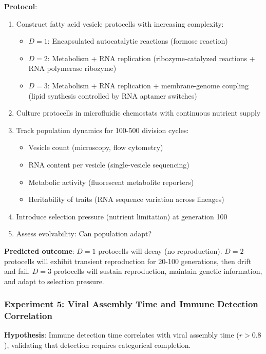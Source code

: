 \documentclass[11pt]{article}
\begin{document}
\textbf{Protocol}:
\begin{enumerate}
\item Construct fatty acid vesicle protocells with increasing complexity:
\begin{itemize}
\item $D = 1$: Encapsulated autocatalytic reactions (formose reaction)
\item $D = 2$: Metabolism + RNA replication (ribozyme-catalyzed reactions + RNA polymerase ribozyme)
\item $D = 3$: Metabolism + RNA replication + membrane-genome coupling (lipid synthesis controlled by RNA aptamer switches)
\end{itemize}
\item Culture protocells in microfluidic chemostats with continuous nutrient supply
\item Track population dynamics for 100-500 division cycles:
\begin{itemize}
\item Vesicle count (microscopy, flow cytometry)
\item RNA content per vesicle (single-vesicle sequencing)
\item Metabolic activity (fluorescent metabolite reporters)
\item Heritability of traits (RNA sequence variation across lineages)
\end{itemize}
\item Introduce selection pressure (nutrient limitation) at generation 100
\item Assess evolvability: Can population adapt?
\end{enumerate}

\textbf{Predicted outcome}: $D = 1$ protocells will decay (no reproduction). $D = 2$ protocells will exhibit transient reproduction for 20-100 generations, then drift and fail. $D = 3$ protocells will sustain reproduction, maintain genetic information, and adapt to selection pressure.

\subsubsection{Experiment 5: Viral Assembly Time and Immune Detection Correlation}

\textbf{Hypothesis}: Immune detection time correlates with viral assembly time ($r > 0.8$), validating that detection requires categorical completion.
\end{document}
